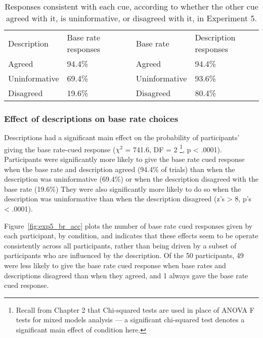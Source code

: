 \begin{table}[h]
  \centering
  \caption[Participants' responses, Experiment 5.]{
    Responses consistent with each cue, according to whether the
    other cue agreed with it, is uninformative, or disagreed with it, in Experiment 5.
    \label{tab:exp5_responses}
  }
  \begin{tabular}{l R{2.5cm} l l R{2.5cm}}
    \toprule
    Description   & Base rate responses & & Base rate     & Description responses\\
    Agreed        & 94.4\%              & & Agreed        & 94.4\%\\
    Uninformative & 69.4\%              & & Uninformative & 93.6\%\\
    Disagreed     & 19.6\%              & & Disagreed     & 80.4\%\\
    \bottomrule
  \end{tabular}
\end{table}

\subsubsection{Effect of descriptions on base rate choices}


Descriptions had a significant main effect on
the probability of participants' giving the base rate-cued response
($\chi^2$ = 741.6, DF = 2%
\footnote{
  Recall from Chapter 2 that Chi-squared tests
  are used in place of ANOVA F tests
  for mixed models analysis ---
  a significant chi-squared test denotes
  a significant main effect of condition here.
  }, p < .0001).
Participants were significantly more likely\footnotemark
to give the base rate cued response when
the base rate and description agreed (94.4\% of trials)
than when the description was uninformative (69.4\%)
or when the description disagreed with the base rate (19.6\%)
They were also significantly more likely to do so
when the description was uninformative
than when the description disagreed
(z's > 8, p's < .0001).


Figure~\ref{fig:exp5_br_acc} plots the number of 
base rate cued responses given by each participant, by condition,
and indicates that these effects seem to be operate consistently
across all participants, rather than being driven
by a subset of participants who are influenced by the description.
Of the 50 participants, 49 were less likely 
to give the base rate cued response
when base rates and descriptions disagreed than when they agreed,
and 1 always gave the base rate cued response.


